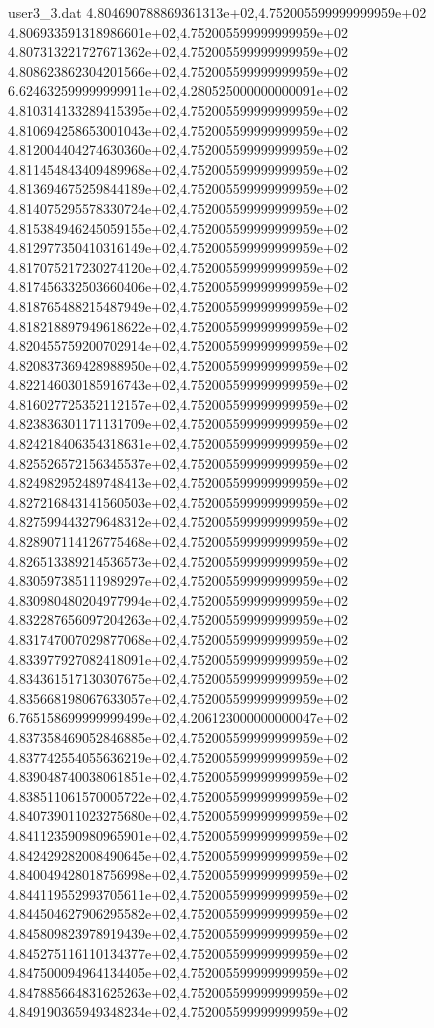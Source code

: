\begin{filecontents}{user3_3.dat}
4.804690788869361313e+02,4.752005599999999959e+02
4.806933591318986601e+02,4.752005599999999959e+02
4.807313221727671362e+02,4.752005599999999959e+02
4.808623862304201566e+02,4.752005599999999959e+02
6.624632599999999911e+02,4.280525000000000091e+02
4.810314133289415395e+02,4.752005599999999959e+02
4.810694258653001043e+02,4.752005599999999959e+02
4.812004404274630360e+02,4.752005599999999959e+02
4.811454843409489968e+02,4.752005599999999959e+02
4.813694675259844189e+02,4.752005599999999959e+02
4.814075295578330724e+02,4.752005599999999959e+02
4.815384946245059155e+02,4.752005599999999959e+02
4.812977350410316149e+02,4.752005599999999959e+02
4.817075217230274120e+02,4.752005599999999959e+02
4.817456332503660406e+02,4.752005599999999959e+02
4.818765488215487949e+02,4.752005599999999959e+02
4.818218897949618622e+02,4.752005599999999959e+02
4.820455759200702914e+02,4.752005599999999959e+02
4.820837369428988950e+02,4.752005599999999959e+02
4.822146030185916743e+02,4.752005599999999959e+02
4.816027725352112157e+02,4.752005599999999959e+02
4.823836301171131709e+02,4.752005599999999959e+02
4.824218406354318631e+02,4.752005599999999959e+02
4.825526572156345537e+02,4.752005599999999959e+02
4.824982952489748413e+02,4.752005599999999959e+02
4.827216843141560503e+02,4.752005599999999959e+02
4.827599443279648312e+02,4.752005599999999959e+02
4.828907114126775468e+02,4.752005599999999959e+02
4.826513389214536573e+02,4.752005599999999959e+02
4.830597385111989297e+02,4.752005599999999959e+02
4.830980480204977994e+02,4.752005599999999959e+02
4.832287656097204263e+02,4.752005599999999959e+02
4.831747007029877068e+02,4.752005599999999959e+02
4.833977927082418091e+02,4.752005599999999959e+02
4.834361517130307675e+02,4.752005599999999959e+02
4.835668198067633057e+02,4.752005599999999959e+02
6.765158699999999499e+02,4.206123000000000047e+02
4.837358469052846885e+02,4.752005599999999959e+02
4.837742554055636219e+02,4.752005599999999959e+02
4.839048740038061851e+02,4.752005599999999959e+02
4.838511061570005722e+02,4.752005599999999959e+02
4.840739011023275680e+02,4.752005599999999959e+02
4.841123590980965901e+02,4.752005599999999959e+02
4.842429282008490645e+02,4.752005599999999959e+02
4.840049428018756998e+02,4.752005599999999959e+02
4.844119552993705611e+02,4.752005599999999959e+02
4.844504627906295582e+02,4.752005599999999959e+02
4.845809823978919439e+02,4.752005599999999959e+02
4.845275116110134377e+02,4.752005599999999959e+02
4.847500094964134405e+02,4.752005599999999959e+02
4.847885664831625263e+02,4.752005599999999959e+02
4.849190365949348234e+02,4.752005599999999959e+02

\end{filecontents}
